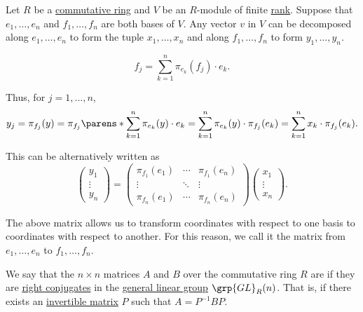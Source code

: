 \begin{concept}\label{con:change_of_basis}
  Let \( R \) be a \hyperref[def:ring/commutative]{commutative ring} and \( V \) be an \( R \)-module of finite \hyperref[def:module_rank]{rank}. Suppose that \( e_1, \ldots, e_n \) and \( f_1, \ldots, f_n \) are both bases of \( V \). Any vector \( v \) in \( V \) can be decomposed along \( e_1, \ldots, e_n \) to form the tuple \( x_1, \ldots, x_n \) and along \( f_1, \ldots, f_n \) to form \( y_1, \ldots, y_n \).

  \begin{equation*}
    f_j = \sum_{k=1}^n \pi_{e_k}(f_j) \cdot e_k.
  \end{equation*}

  Thus, for \( j = 1, \ldots, n \),
  \begin{equation*}
    y_j
    =
    \pi_{f_j}(y)
    =
    \pi_{f_j}\parens*{ \sum_{k=1}^n \pi_{e_k}(y) \cdot e_k }
    =
    \sum_{k=1}^n \pi_{e_k}(y) \cdot \pi_{f_j}(e_k)
    =
    \sum_{k=1}^n x_k \cdot \pi_{f_j}(e_k).
  \end{equation*}

  This can be alternatively written as
  \begin{equation*}
    \begin{pmatrix}
      y_1 \\ \vdots \\ y_n
    \end{pmatrix}
    =
    \begin{pmatrix}
      \pi_{f_1}(e_1) & \cdots & \pi_{f_1}(e_n) \\
      \vdots         & \ddots & \vdots         \\
      \pi_{f_n}(e_1) & \cdots & \pi_{f_n}(e_n)
    \end{pmatrix}
    \begin{pmatrix}
      x_1 \\ \vdots \\ x_n
    \end{pmatrix}.
  \end{equation*}

  The above matrix allows us to transform coordinates with respect to one basis to coordinates with respect to another. For this reason, we call it the  matrix from \( e_1, \ldots, e_n \) to \( f_1, \ldots, f_n \).
\end{concept}

\begin{definition}\label{def:similar_matrices}
  We say that the \( n \times n \) matrices \( A \) and \( B \) over the commutative ring \( R \) are  if they are \hyperref[thm:group_conjugation_action]{right conjugates} in the \hyperref[def:linear_groups]{general linear group} \( \grp{GL}_R(n) \). That is, if there exists an \hyperref[def:inverse_matrix]{invertible matrix} \( P \) such that \( A = P^{-1} B P \).
\end{definition}

